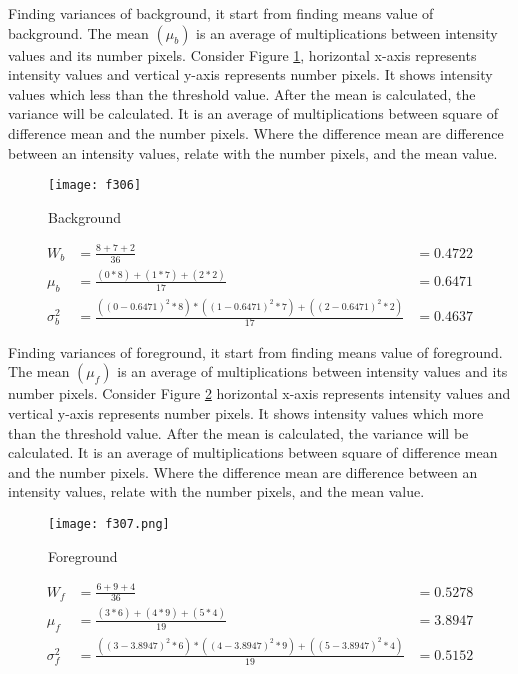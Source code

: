 Finding variances of background, it start from finding means value of background. The mean $(\mu_{b})$ is an average of multiplications between intensity values and its number pixels. Consider Figure \ref{fig:f306}, horizontal x-axis represents intensity values and vertical y-axis represents number pixels. It shows intensity values which less than the threshold value. After the mean is calculated, the variance will be calculated. It is an average of multiplications between square of difference mean and the number pixels. Where the difference mean are difference between an intensity values, relate with the number pixels, and the mean value.
\begin{figure}[t]
	\centering
	\texttt{[image: f306]}	
	\caption{Background}
	\label{fig:f306}
\end{figure}
\begin{align}
	W_{b} &= \frac{8+7+2}{36} &= 0.4722 \label{eq:w_b}\\
	\mu_{b} &= \frac{(0*8)+(1*7)+(2*2)}{17} &= 0.6471 \label{eq:mu_b}\\	
	\sigma_{b}^2 &= \frac{((0-0.6471)^2*8)*((1-0.6471)^2*7)+((2-0.6471)^2*2)}{17} &= 0.4637\label{eq:sig_b}
\end{align}

Finding variances of foreground, it start from finding means value of foreground. The mean $(\mu_{f})$ is an average of multiplications between intensity values and its number pixels. Consider Figure \ref{fig:f307} horizontal x-axis represents intensity values and vertical y-axis represents number pixels. It shows intensity values which more than the threshold value. After the mean is calculated, the variance will be calculated. It is an average of multiplications between square of difference mean and the number pixels. Where the difference mean are difference between an intensity values, relate with the number pixels, and the mean value.
	
\begin{figure}[t]
	\centering
	\texttt{[image: f307.png]}	
	\caption{Foreground}
	\label{fig:f307}
\end{figure}
\begin{align}
	W_{f} &= \frac{6+9+4}{36} &= 0.5278 \label{eq:w_f}\\
	\mu_{f} &= \frac{(3*6)+(4*9)+(5*4)}{19} &= 3.8947 \label{eq:mu_f}\\	
	\sigma_{f}^2 &= \frac{((3-3.8947)^2*6)*((4-3.8947)^2*9)+((5-3.8947)^2*4)}{19} &= 0.5152\label{eq:sig_f}
\end{align}	

